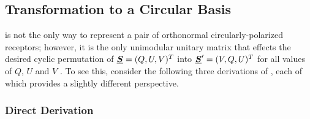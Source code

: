 \subsection{Transformation to a Circular Basis}
\label{app:circular_basis}

 is not the only way to represent a pair of orthonormal
circularly-polarized receptors; however, it is the only unimodular unitary matrix that effects the desired cyclic permutation of $\underline{\mbox{\boldmath $S$}}=(Q,U,V)^T$ into $\underline{\mbox{\boldmath $S$}}'=(V,Q,U)^T$ for all values of $Q$, $U$ and $V$ \citep[assuming the Stokes V sign convention of ][]{ieee145}.
%
To see this, consider the following three derivations of , each of which provides a slightly different perspective.

\subsubsection{Direct Derivation}

